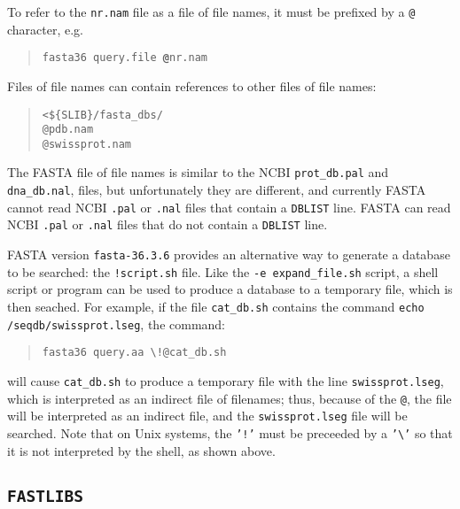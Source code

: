 \documentclass[11pt]{article}
\begin{document}
To refer to the \texttt{nr.nam} file as a file of file names, it must
be prefixed by a \texttt{@} character, e.g.
\begin{quote}
\texttt{fasta36 query.file \textbf{@}nr.nam}
\end{quote}
Files of file names can contain references to other files of file names:
\begin{quote}
\begin{verbatim}
<${SLIB}/fasta_dbs/
@pdb.nam
@swissprot.nam
\end{verbatim}
\end{quote}
The FASTA file of file names is similar to the NCBI
\texttt{prot\_db.pal} and \texttt{dna\_db.nal}, files, but
unfortunately they are different, and currently FASTA cannot read NCBI
\texttt{.pal} or \texttt{.nal} files that contain a \texttt{DBLIST}
line. FASTA can read NCBI \texttt{.pal} or \texttt{.nal} files that do
not contain a \texttt{DBLIST} line.

FASTA version \texttt{fasta-36.3.6} provides an alternative way to
generate a database to be searched: the \texttt{!script.sh} file.
Like the \texttt{-e expand\_file.sh} script, a shell script or program
can be used to produce a database to a temporary file, which is then
seached.  For example, if the file \texttt{cat\_db.sh} contains the
command \texttt{echo /seqdb/swissprot.lseg}, the command:
\begin{quote}
\begin{verbatim}
fasta36 query.aa \!@cat_db.sh
\end{verbatim}
\end{quote}
will cause \texttt{cat\_db.sh} to produce a temporary file with the
line \texttt{swissprot.lseg}, which is interpreted as an indirect file
of filenames; thus, because of the \texttt{@}, the file will be
interpreted as an indirect file, and the \texttt{swissprot.lseg} file
will be searched.  Note that on Unix systems, the \texttt{'!'} must be
preceeded by a \texttt{'\textbackslash'} so that it is not interpreted by the
shell, as shown above.

\subsection{\texttt{FASTLIBS}}
\label{fastlibs}
\end{document}
